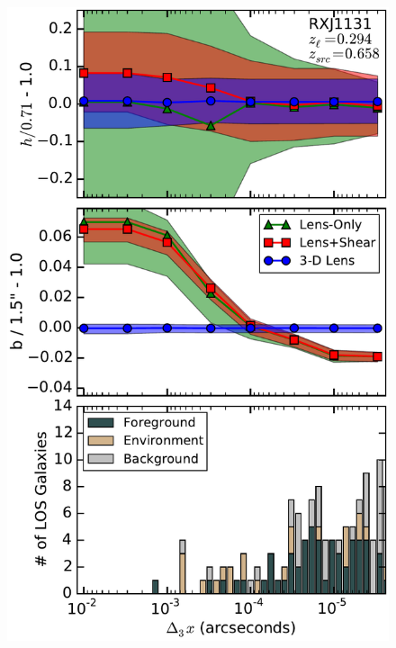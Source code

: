 \documentclass{emulateapj}
\begin{document}
\begin{figure}[ht]
\begin{center}
\includegraphics[width=1\columnwidth]{new_RXJ1131_reallos.pdf}

\end{center}
\end{figure}
\end{document}
